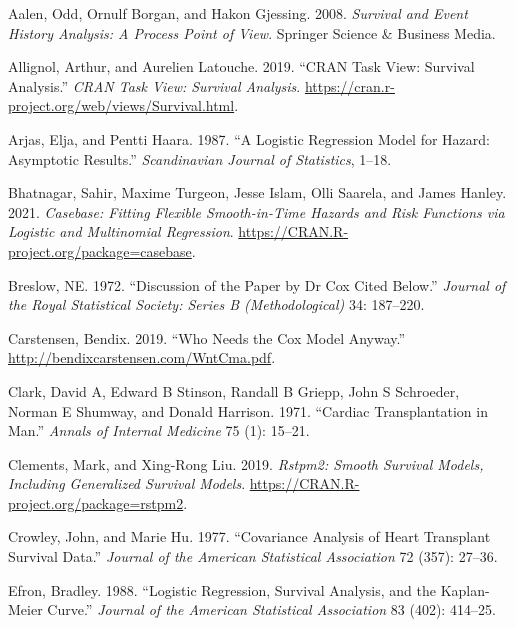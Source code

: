 \hypertarget{refs}{}
\begin{CSLReferences}{1}{0}
\leavevmode{}%
Aalen, Odd, Ornulf Borgan, and Hakon Gjessing. 2008. \emph{Survival and Event History Analysis: A Process Point of View}. Springer Science \& Business Media.

\leavevmode{}%
Allignol, Arthur, and Aurelien Latouche. 2019. {``CRAN Task View: Survival Analysis.''} \emph{CRAN Task View: Survival Analysis}. \url{https://cran.r-project.org/web/views/Survival.html}.

\leavevmode{}%
Arjas, Elja, and Pentti Haara. 1987. {``A Logistic Regression Model for Hazard: Asymptotic Results.''} \emph{Scandinavian Journal of Statistics}, 1--18.

\leavevmode{}%
Bhatnagar, Sahir, Maxime Turgeon, Jesse Islam, Olli Saarela, and James Hanley. 2021. \emph{Casebase: Fitting Flexible Smooth-in-Time Hazards and Risk Functions via Logistic and Multinomial Regression}. \url{https://CRAN.R-project.org/package=casebase}.

\leavevmode{}%
Breslow, NE. 1972. {``Discussion of the Paper by {Dr Cox} Cited Below.''} \emph{Journal of the Royal Statistical Society: Series B (Methodological)} 34: 187--220.

\leavevmode{}%
Carstensen, Bendix. 2019. {``Who Needs the Cox Model Anyway.''} \url{http://bendixcarstensen.com/WntCma.pdf}.

\leavevmode{}%
Clark, David A, Edward B Stinson, Randall B Griepp, John S Schroeder, Norman E Shumway, and Donald Harrison. 1971. {``Cardiac Transplantation in Man.''} \emph{Annals of Internal Medicine} 75 (1): 15--21.

\leavevmode{}%
Clements, Mark, and Xing-Rong Liu. 2019. \emph{Rstpm2: Smooth Survival Models, Including Generalized Survival Models}. \url{https://CRAN.R-project.org/package=rstpm2}.

\leavevmode{}%
Crowley, John, and Marie Hu. 1977. {``Covariance Analysis of Heart Transplant Survival Data.''} \emph{Journal of the American Statistical Association} 72 (357): 27--36.

\leavevmode{}%
Efron, Bradley. 1988. {``Logistic Regression, Survival Analysis, and the Kaplan-Meier Curve.''} \emph{Journal of the American Statistical Association} 83 (402): 414--25.


\end{CSLReferences}
